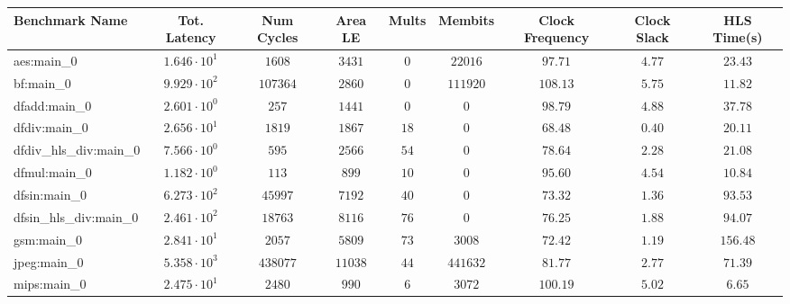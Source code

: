 \begin{tabular}{|l|c|c|c|c|c|c|c|c|}
\hline
Benchmark Name          & Tot. Latency           & Num Cycles & Area LE   & Mults   & Membits    & Clock Frequency & Clock Slack & HLS Time(s) \\
\hline
aes:main\_0             & $ 1.646 \cdot 10^{1} $ & $ 1608   $ & $ 3431  $ & $ 0   $ & $ 22016  $ & $ 97.71       $ & $ 4.77    $ & $ 23.43   $ \\
bf:main\_0              & $ 9.929 \cdot 10^{2} $ & $ 107364 $ & $ 2860  $ & $ 0   $ & $ 111920 $ & $ 108.13      $ & $ 5.75    $ & $ 11.82   $ \\
dfadd:main\_0           & $ 2.601 \cdot 10^{0} $ & $ 257    $ & $ 1441  $ & $ 0   $ & $ 0      $ & $ 98.79       $ & $ 4.88    $ & $ 37.78   $ \\
dfdiv:main\_0           & $ 2.656 \cdot 10^{1} $ & $ 1819   $ & $ 1867  $ & $ 18  $ & $ 0      $ & $ 68.48       $ & $ 0.40    $ & $ 20.11   $ \\
dfdiv\_hls\_div:main\_0 & $ 7.566 \cdot 10^{0} $ & $ 595    $ & $ 2566  $ & $ 54  $ & $ 0      $ & $ 78.64       $ & $ 2.28    $ & $ 21.08   $ \\
dfmul:main\_0           & $ 1.182 \cdot 10^{0} $ & $ 113    $ & $ 899   $ & $ 10  $ & $ 0      $ & $ 95.60       $ & $ 4.54    $ & $ 10.84   $ \\
dfsin:main\_0           & $ 6.273 \cdot 10^{2} $ & $ 45997  $ & $ 7192  $ & $ 40  $ & $ 0      $ & $ 73.32       $ & $ 1.36    $ & $ 93.53   $ \\
dfsin\_hls\_div:main\_0 & $ 2.461 \cdot 10^{2} $ & $ 18763  $ & $ 8116  $ & $ 76  $ & $ 0      $ & $ 76.25       $ & $ 1.88    $ & $ 94.07   $ \\
gsm:main\_0             & $ 2.841 \cdot 10^{1} $ & $ 2057   $ & $ 5809  $ & $ 73  $ & $ 3008   $ & $ 72.42       $ & $ 1.19    $ & $ 156.48  $ \\
jpeg:main\_0            & $ 5.358 \cdot 10^{3} $ & $ 438077 $ & $ 11038 $ & $ 44  $ & $ 441632 $ & $ 81.77       $ & $ 2.77    $ & $ 71.39   $ \\
mips:main\_0            & $ 2.475 \cdot 10^{1} $ & $ 2480   $ & $ 990   $ & $ 6   $ & $ 3072   $ & $ 100.19      $ & $ 5.02    $ & $ 6.65    $ \\

\end{tabular}
